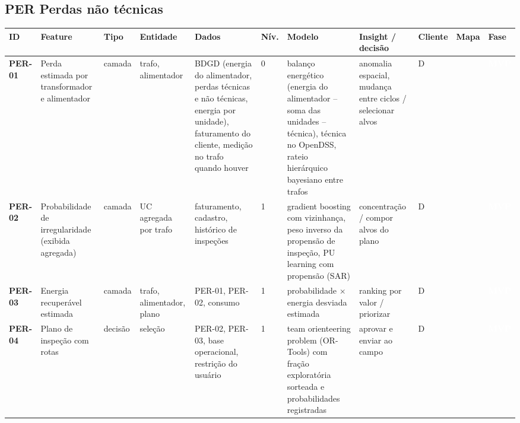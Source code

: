 \subsection*{PER \textperiodcentered{} Perdas não técnicas}
\label{cat:PER}
{\footnotesize\setlength{\tabcolsep}{3pt}
\begin{longtable}{@{}P{1.35cm}P{4.1cm}P{1.3cm}P{3.1cm}P{3.7cm}C{0.6cm}P{3.6cm}P{3.3cm}P{1.1cm}P{0.9cm}P{1.1cm}@{}}
\toprule
\textbf{ID} & \textbf{Feature} & \textbf{Tipo} & \textbf{Entidade} & \textbf{Dados} & \textbf{Nív.} & \textbf{Modelo} & \textbf{Insight / decisão} & \textbf{Cliente} & \textbf{Mapa} & \textbf{Fase} \\
\midrule\endhead
\textbf{PER-01} & Perda estimada por transformador e alimentador & camada & trafo, alimentador & BDGD (energia do alimentador, perdas técnicas e não técnicas, energia por unidade), faturamento do cliente, medição no trafo quando houver & 0 & balanço energético (energia do alimentador -- soma das unidades -- técnica), técnica no OpenDSS, rateio hierárquico bayesiano entre trafos & anomalia espacial, mudança entre ciclos / selecionar alvos & D &  & \colorbox{fMVP}{\scriptsize \textcolor{white}{\textbf{MVP}}} \\
\textbf{PER-02} & Probabilidade de irregularidade (exibida agregada) & camada & UC agregada por trafo & faturamento, cadastro, histórico de inspeções & 1 & gradient boosting com vizinhança, peso inverso da propensão de inspeção, PU learning com propensão (SAR) & concentração / compor alvos do plano & D &  & \colorbox{fMVP}{\scriptsize \textcolor{white}{\textbf{MVP}}} \\
\textbf{PER-03} & Energia recuperável estimada & camada & trafo, alimentador, plano & PER-01, PER-02, consumo & 1 & probabilidade $\times$ energia desviada estimada & ranking por valor / priorizar & D &  & \colorbox{fMVP}{\scriptsize \textcolor{white}{\textbf{MVP}}} \\
\textbf{PER-04} & Plano de inspeção com rotas & decisão & seleção & PER-02, PER-03, base operacional, restrição do usuário & 1 & team orienteering problem (OR-Tools) com fração exploratória sorteada e probabilidades registradas & aprovar e enviar ao campo & D &  & \colorbox{fMVP}{\scriptsize \textcolor{white}{\textbf{MVP}}} \\

\end{longtable}}
